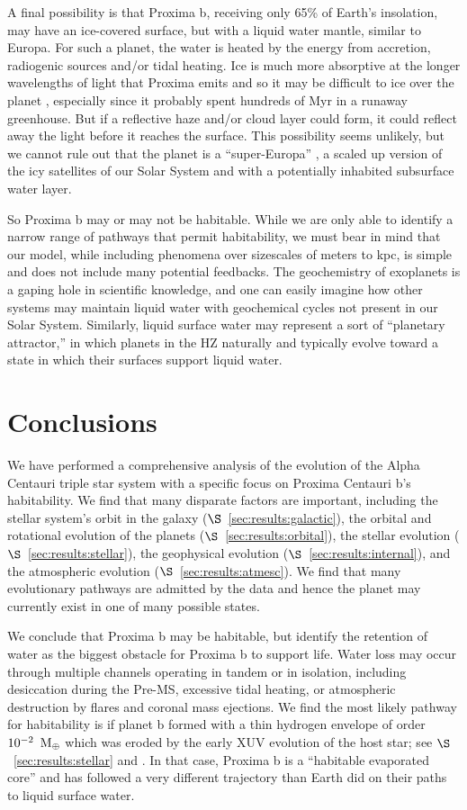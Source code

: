 \documentclass[preprint,12pt]{aastex}
\newcommand{\xxx}[1]{{\color{red} #1}} %
\def\mearth{{\rm\,M_\oplus}}
\begin{document}
A final possibility is that Proxima b, receiving only 65\% of Earth's
insolation, may have an ice-covered surface, but with a liquid water
mantle, similar to Europa. For such a planet, the water is heated by
the energy from accretion, radiogenic sources and/or tidal
heating. Ice is much more absorptive at the longer wavelengths of
light that Proxima emits and so it may be difficult to ice over the
planet \xxx{\citep{Joshi12,Shields13}}, especially since it probably spent
hundreds of Myr in a runaway greenhouse. But if a reflective haze
and/or cloud layer could form, it could reflect away the light before
it reaches the surface. This possibility seems unlikely, but we cannot
rule out that the planet is a ``super-Europa'' \citep{BarnesHeller13},
a scaled up version of the icy satellites of our Solar System and with
a potentially inhabited subsurface water layer.

So Proxima b may or may not be habitable. While we are only able to
identify a narrow range of pathways that permit habitability, we must
bear in mind that our model, while including phenomena over sizescales
of meters to kpc, is simple and does not include many potential
feedbacks. The geochemistry of exoplanets is a gaping hole in
scientific knowledge, and one can easily imagine how other systems may
maintain liquid water with geochemical cycles not present in our Solar
System. Similarly, liquid surface water may represent a sort of
``planetary attractor,'' in which planets in the HZ naturally and
typically evolve toward a state in which their surfaces support liquid
water.

\section{Conclusions\label{sec:concl}}
We have performed a comprehensive analysis of the evolution of the
Alpha Centauri triple star system with a specific focus on Proxima Centauri b's
habitability. We find that many disparate factors are important,
including the stellar system's orbit in the galaxy
($\S$~\ref{sec:results:galactic}), the orbital and rotational evolution of
the planets ($\S$~\ref{sec:results:orbital}), the stellar evolution
($\S$~\ref{sec:results:stellar}), the geophysical evolution
($\S$~\ref{sec:results:internal}), and the atmospheric evolution
($\S$~\ref{sec:results:atmesc}). We find that many evolutionary pathways
are admitted by the data and hence the planet may currently exist in
one of many possible states.

We conclude that Proxima b may be habitable, but identify the
retention of water as the biggest obstacle for Proxima b to support
life. Water loss may occur through multiple channels operating in
tandem or in isolation, including desiccation during the Pre-MS,
excessive tidal heating, or atmospheric destruction by flares and
coronal mass ejections. We find the most likely pathway for
habitability is if planet b formed with a thin hydrogen envelope of
order $10^{-2}~\mearth$ which was eroded by the early XUV evolution of
the host star; see $\S$~\ref{sec:results:stellar} and \cite{Luger15}. In
that case, Proxima b is a ``habitable evaporated core'' and has
followed a very different trajectory than Earth did on their paths to
liquid surface water.
\end{document}
